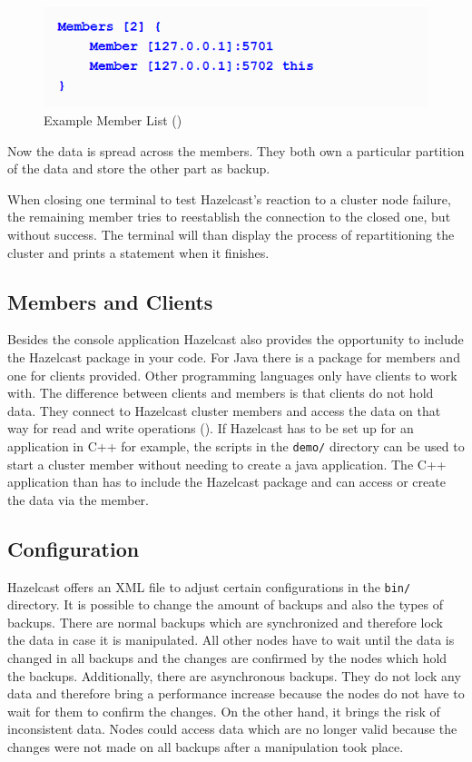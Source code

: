 \begin{flushleft}
\begin{figure}[h]
    \includegraphics{content/images/hazelcastMembers.PNG}
    \caption{Example Member List (\cite{johns2015})}
\end{figure}
\end{flushleft}
Now the data is spread across the members. They both own a particular partition of the data and store the other part as backup.

When closing one terminal to test Hazelcast's reaction to a cluster node failure, the remaining member tries to reestablish the connection to the closed one, but without success. The terminal will than display the process of repartitioning the cluster and prints a statement when it finishes.
\subsection*{Members and Clients}
Besides the console application Hazelcast also provides the opportunity to include the Hazelcast package in your code. For Java there is a package for members and one for clients provided. Other programming languages only have clients to work with. The difference between clients and members is that clients do not hold data. They connect to Hazelcast cluster members and access the data on that way for read and write operations (\cite{hazelcastmanual}). If Hazelcast has to be set up for an application in C++ for example, the scripts in the \texttt{demo/} directory can be used to start a cluster member without needing to create a java application. The C++ application than has to include the Hazelcast package and can access or create the data via the member.
\subsection*{Configuration}
Hazelcast offers an XML file to adjust certain configurations in the \texttt{bin/} directory.
It is possible to change the amount of backups and also the types of backups. There are normal backups which are synchronized and therefore lock the data in case it is manipulated. All other nodes have to wait until the data is changed in all backups and the changes are confirmed by the nodes which hold the backups. Additionally, there are asynchronous backups. They do not lock any data and therefore bring a performance increase because the nodes do not have to wait for them to confirm the changes. On the other hand, it brings the risk of inconsistent data. Nodes could access data which are no longer valid because the changes were not made on all backups after a manipulation took place.

